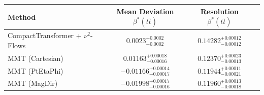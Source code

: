     \begin{tabular}{lccc}
        \toprule
        Method & Mean Deviation $\beta^*(t\bar{t})$ & Resolution $\beta^*(t\bar{t})$ \\
        \midrule
        CompactTransformer + $\nu^2$-Flows & $0.0023^{+0.0002}_{-0.0002}$ & $0.14282^{+0.00012}_{-0.00012}$ \\
        MMT (Cartesian) & $0.01163^{+0.00018}_{-0.00016}$ & $0.12370^{+0.00023}_{-0.00013}$ \\
        MMT (PtEtaPhi) & $-0.01166^{+0.00014}_{-0.00017}$ & $0.11944^{+0.00011}_{-0.00021}$ \\
        MMT (MagDir) & $-0.01998^{+0.00017}_{-0.00016}$ & $0.11960^{+0.00013}_{-0.00018}$ \\
        \bottomrule
    \end{tabular}